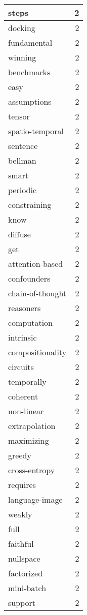 \begin{table}[h]
\begin{tabular}{|l|r|}
\hline
steps & 2 \\
\hline
docking & 2 \\
\hline
fundamental & 2 \\
\hline
winning & 2 \\
\hline
benchmarks & 2 \\
\hline
easy & 2 \\
\hline
assumptions & 2 \\
\hline
tensor & 2 \\
\hline
spatio-temporal & 2 \\
\hline
sentence & 2 \\
\hline
bellman & 2 \\
\hline
smart & 2 \\
\hline
periodic & 2 \\
\hline
constraining & 2 \\
\hline
know & 2 \\
\hline
diffuse & 2 \\
\hline
get & 2 \\
\hline
attention-based & 2 \\
\hline
confounders & 2 \\
\hline
chain-of-thought & 2 \\
\hline
reasoners & 2 \\
\hline
computation & 2 \\
\hline
intrinsic & 2 \\
\hline
compositionality & 2 \\
\hline
circuits & 2 \\
\hline
temporally & 2 \\
\hline
coherent & 2 \\
\hline
non-linear & 2 \\
\hline
extrapolation & 2 \\
\hline
maximizing & 2 \\
\hline
greedy & 2 \\
\hline
cross-entropy & 2 \\
\hline
requires & 2 \\
\hline
language-image & 2 \\
\hline
weakly & 2 \\
\hline
full & 2 \\
\hline
faithful & 2 \\
\hline
nullspace & 2 \\
\hline
factorized & 2 \\
\hline
mini-batch & 2 \\
\hline
support & 2 \\

\end{tabular}
\end{table}
